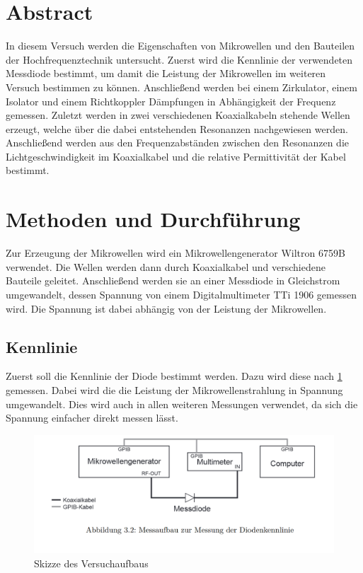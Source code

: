 \section{Abstract}
In diesem Versuch werden die Eigenschaften von Mikrowellen und den Bauteilen der Hochfrequenztechnik untersucht. Zuerst wird die Kennlinie der verwendeten Messdiode bestimmt, um damit die Leistung der Mikrowellen im weiteren Versuch bestimmen zu können. Anschließend werden bei einem Zirkulator, einem Isolator und einem Richtkoppler Dämpfungen in Abhängigkeit der Frequenz gemessen. Zuletzt werden in zwei verschiedenen Koaxialkabeln stehende Wellen erzeugt, welche über die dabei entstehenden Resonanzen nachgewiesen werden. Anschließend werden aus den Frequenzabständen zwischen den Resonanzen die Lichtgeschwindigkeit im Koaxialkabel und die relative Permittivität der Kabel bestimmt.

\section{Methoden und Durchführung}
Zur Erzeugung der Mikrowellen wird ein Mikrowellengenerator Wiltron 6759B verwendet. Die Wellen werden dann durch Koaxialkabel und verschiedene Bauteile geleitet. Anschließend werden sie an einer Messdiode in Gleichstrom umgewandelt, dessen Spannung von einem Digitalmultimeter TTi 1906 gemessen wird. Die Spannung ist dabei abhängig von der Leistung der Mikrowellen.
\subsection{Kennlinie}
Zuerst soll die Kennlinie der Diode bestimmt werden. Dazu wird diese nach \cref{Aufbau} gemessen. Dabei wird die die Leistung der Mikrowellenstrahlung in Spannung umgewandelt. Dies wird auch in allen weiteren Messungen verwendet, da sich die Spannung einfacher direkt messen lässt.

\begin{figure}[h]
	\centering
	\includegraphics[scale=0.4]{Diode_Aufbau.PNG}
	\caption{Skizze des Versuchaufbaus}
	\label{Aufbau}
\end{figure}

